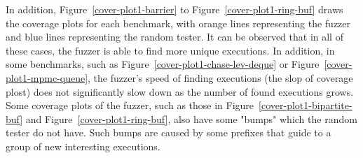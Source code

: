 In addition, Figure~\ref{cover-plot1-barrier} to Figure~\ref{cover-plot1-ring-buf} draws the coverage plots for each benchmark, with orange lines representing the fuzzer and blue lines representing the random tester. It can be observed that in all of these cases, the fuzzer is able to find more unique executions. In addition, in some benchmarks, such as Figure~\ref{cover-plot1-chase-lev-deque} or Figure~\ref{cover-plot1-mpmc-queue}, the fuzzer's speed of finding executions (the slop of coverage plost) does not significantly slow down as the number of found executions grows. Some coverage plots of the fuzzer, such as those in Figure~\ref{cover-plot1-bipartite-buf} and Figure~\ref{cover-plot1-ring-buf}, also have some "bumps" which the random tester do not have. Such bumps are caused by some prefixes that guide to a group of new interesting executions.

